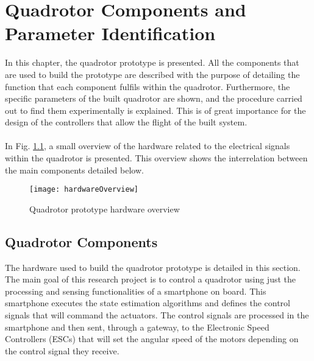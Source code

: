 \chapter{Quadrotor Components and Parameter Identification} \label{ch:prototype}
In this chapter, the quadrotor prototype is presented. All the components that are used to build the prototype are described with the purpose of detailing the function that each component fulfils within the quadrotor. Furthermore, the specific parameters of the built quadrotor are shown, and the procedure carried out to find them experimentally is explained. This is of great importance for the design of the controllers that allow the flight of the built system.
\\\\
In Fig. \ref{fig:hardwareoverview}, a small overview of the hardware related to the electrical signals within the quadrotor is presented. This overview shows the interrelation between the main components detailed below.
\begin{figure}[h]
	\begin{center}
		\texttt{[image: hardwareOverview]}    
		\caption{Quadrotor prototype hardware overview} 
		\label{fig:hardwareoverview}
	\end{center}
\end{figure}

\section{Quadrotor Components}
\label{sec:components}
The hardware used to build the quadrotor prototype is detailed in this section. The main goal of this research project is to control a quadrotor using just the processing and sensing functionalities of a smartphone on board. This smartphone executes the state estimation algorithms and defines the control signals that will command the actuators. The control signals are processed in the smartphone and then sent, through a gateway, to the Electronic Speed Controllers (ESCs) that will set the angular speed of the motors depending on the control signal they receive.
